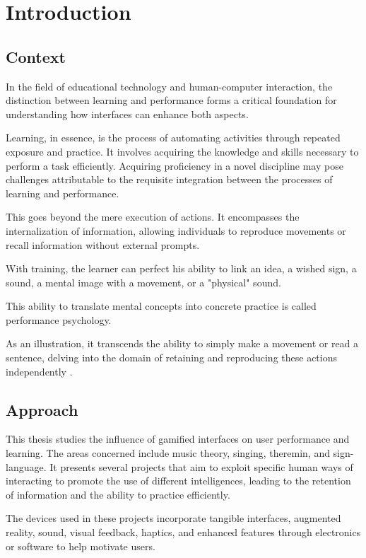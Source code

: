 \chapter{Introduction}

\section{Context}

In the field of educational technology and human-computer interaction, the distinction between learning and performance forms a critical foundation for understanding how interfaces can enhance both aspects.  

Learning, in essence, is the process of automating activities through repeated exposure and practice. It involves acquiring the knowledge and skills necessary to perform a task efficiently. Acquiring proficiency in a novel discipline may pose challenges attributable to the requisite integration between the processes of learning and performance. 

This goes beyond the mere execution of actions. It encompasses the internalization of information, allowing individuals to reproduce movements or recall information without external prompts.  

With training, the learner can perfect his ability to link an idea, a wished sign, a sound, a mental image with a movement, or a "physical" sound. 

This ability to translate mental concepts into concrete practice is called performance psychology. 

As an illustration, it transcends the ability to simply make a movement or read a sentence, delving into the domain of retaining and reproducing these actions independently \cite{kantak2012learning}. 


\section{Approach} 

This thesis studies the influence of gamified interfaces on user performance and learning. The areas concerned include music theory, singing, theremin, and sign-language. It presents several projects that aim to exploit specific human ways of interacting to promote the use of different intelligences, leading to the retention of information and the ability to practice efficiently.  

The devices used in these projects incorporate tangible interfaces, augmented reality, sound, visual feedback, haptics, and enhanced features through electronics or software to help motivate users. 

